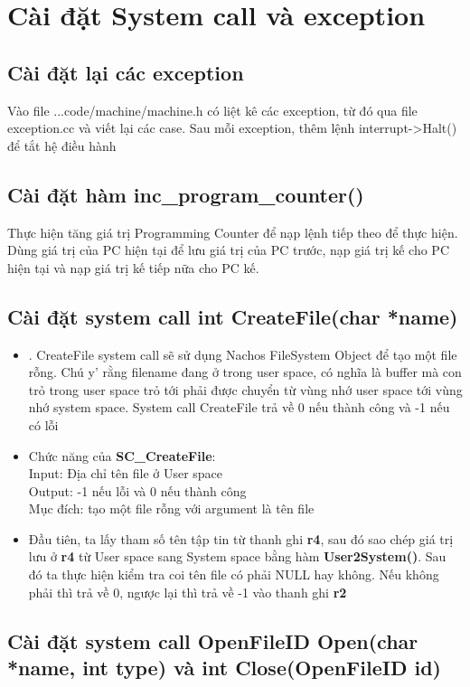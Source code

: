 \documentclass[12pt,a4paper]{article}
\begin{document}
\section{Cài đặt System call và exception}
\subsection{Cài đặt lại các exception}
\textnormal{Vào file ...code/machine/machine.h có liệt kê các exception, từ đó qua file exception.cc và viết lại các case. Sau mỗi exception, thêm lệnh interrupt->Halt() để tắt hệ điều hành}
\subsection{Cài đặt hàm inc\_program\_counter()}
\textnormal{Thực hiện tăng giá trị Programming Counter để nạp lệnh tiếp theo để thực hiện. Dùng giá trị của PC hiện tại để lưu giá trị của PC trước, nạp giá trị kế cho PC hiện tại và nạp giá trị kế tiếp nữa cho PC kế.}
\subsection{Cài đặt system call int CreateFile(char *name)}
\begin{itemize}
    \item \textnormal{. CreateFile system call sẽ sử dụng Nachos FileSystem Object để tạo một file rỗng. Chú y’ rằng filename đang ở trong user space, có nghĩa là buffer mà con trỏ trong user space trỏ tới phải được chuyển từ vùng nhớ user space tới vùng nhớ system space. System call CreateFile trả về 0 nếu thành công và -1 nếu có lỗi}
    \item \textnormal{Chức năng của \textbf{SC\_CreateFile}:}\\
    \textnormal{Input: Địa chỉ tên file ở User space}\\
    \textnormal{Output: -1 nếu lỗi và 0 nếu thành công}\\
    \textnormal{Mục đích: tạo một file rỗng với argument là tên file}
    \item \textnormal{Đầu tiên, ta lấy tham số tên tập tin từ thanh ghi \textbf{r4}, sau đó sao chép giá trị lưu ở \textbf{r4} từ User space sang System space bằng hàm \textbf{User2System()}. Sau đó ta thực hiện kiểm tra coi tên file có phải NULL hay không. Nếu không phải thì trả về 0, ngược lại thì trả về -1 vào thanh ghi \textbf{r2}} 
\end{itemize}
\subsection{Cài đặt system call OpenFileID Open(char *name, int type) và int Close(OpenFileID id)}
\end{document}

